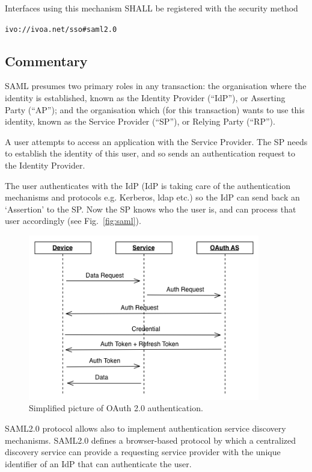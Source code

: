\documentclass[11pt,a4paper]{ivoa}
\begin{document}
{{{Interfaces using this mechanism SHALL  be registered with the security method

\texttt{ivo://ivoa.net/sso\#saml2.0}


\subsection{Commentary}
SAML presumes two primary roles in any transaction: the organisation where the identity is established,
known as the Identity Provider (``IdP''), or Asserting Party (``AP'');
and the organisation which (for this transaction) wants to use this identity, known as the Service Provider (``SP''),
or Relying Party (``RP'').

A user attempts to access an application with the Service Provider.
The SP needs to establish the identity of this user, and so sends an authentication request to the Identity Provider.

The user authenticates with the IdP (IdP is taking care of the authentication mechanisms and protocols e.g. Kerberos, ldap etc.) so the IdP can send back an `Assertion' to the SP.
Now the SP knows who the user is, and can process that user accordingly (see Fig.~\ref{fig:saml}).
\begin{figure}
\centering
\includegraphics[width=0.9\textwidth]{SSO_image003.png}
\caption{Simplified picture of OAuth 2.0 authentication.}
\label{fig:oauth}
\end{figure}

SAML2.0 protocol allows also to implement authentication service discovery mechanisms. SAML2.0  defines a browser-based protocol
by which a centralized discovery service can provide a requesting service provider with the unique identifier of an
IdP that can authenticate the user.


}}}
\end{document}
